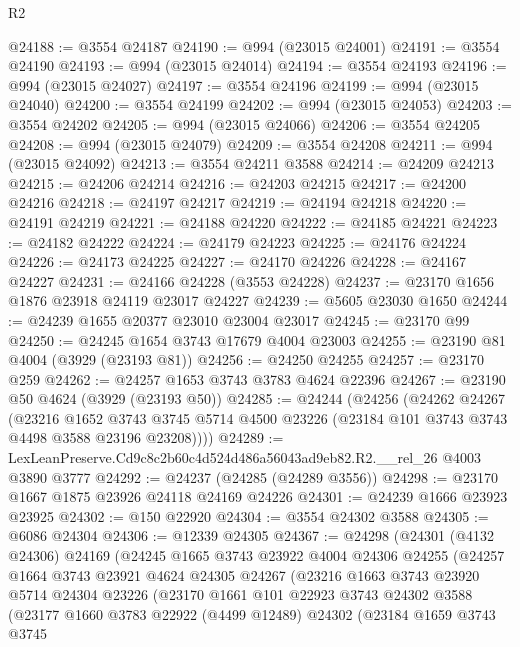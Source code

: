 \begin{lexlean}{R2}
\begin{coremodule}
@24188 := @3554 @24187
@24190 := @994 (@23015 @24001)
@24191 := @3554 @24190
@24193 := @994 (@23015 @24014)
@24194 := @3554 @24193
@24196 := @994 (@23015 @24027)
@24197 := @3554 @24196
@24199 := @994 (@23015 @24040)
@24200 := @3554 @24199
@24202 := @994 (@23015 @24053)
@24203 := @3554 @24202
@24205 := @994 (@23015 @24066)
@24206 := @3554 @24205
@24208 := @994 (@23015 @24079)
@24209 := @3554 @24208
@24211 := @994 (@23015 @24092)
@24213 := @3554 @24211 @3588
@24214 := @24209 @24213
@24215 := @24206 @24214
@24216 := @24203 @24215
@24217 := @24200 @24216
@24218 := @24197 @24217
@24219 := @24194 @24218
@24220 := @24191 @24219
@24221 := @24188 @24220
@24222 := @24185 @24221
@24223 := @24182 @24222
@24224 := @24179 @24223
@24225 := @24176 @24224
@24226 := @24173 @24225
@24227 := @24170 @24226
@24228 := @24167 @24227
@24231 := @24166 @24228 (@3553 @24228)
@24237 := @23170 @1656 @1876 @23918 @24119 @23017 @24227
@24239 := @5605 @23030 @1650
@24244 := @24239 @1655 @20377 @23010 @23004 @23017
@24245 := @23170 @99
@24250 := @24245 @1654 @3743 @17679 @4004 @23003
@24255 := @23190 @81 @4004 (@3929 (@23193 @81))
@24256 := @24250 @24255
@24257 := @23170 @259
@24262 := @24257 @1653 @3743 @3783 @4624 @22396
@24267 := @23190 @50 @4624 (@3929 (@23193 @50))
@24285 := @24244
    (@24256
      (@24262
        @24267
        (@23216
          @1652
          @3743
          @3745
          @5714
          @4500
          @23226
          (@23184 @101 @3743 @3743 @4498 @3588 @23196 @23208))))
@24289 := LexLeanPreserve.Cd9c8c2b60c4d524d486a56043ad9eb82.R2.__rel_26 @4003 @3890 @3777
@24292 := @24237 (@24285 (@24289 @3556))
@24298 := @23170 @1667 @1875 @23926 @24118 @24169 @24226
@24301 := @24239 @1666 @23923 @23925
@24302 := @150 @22920
@24304 := @3554 @24302 @3588
@24305 := @6086 @24304
@24306 := @12339 @24305
@24367 := @24298
    (@24301
      (@4132 @24306)
      @24169
      (@24245
        @1665
        @3743
        @23922
        @4004
        @24306
        @24255
        (@24257
          @1664
          @3743
          @23921
          @4624
          @24305
          @24267
          (@23216
            @1663
            @3743
            @23920
            @5714
            @24304
            @23226
            (@23170
              @1661
              @101
              @22923
              @3743
              @24302
              @3588
              (@23177
                @1660
                @3783
                @22922
                (@4499 @12489)
                @24302
                (@23184
                  @1659
                  @3743
                  @3745

\end{coremodule}
\end{lexlean}
